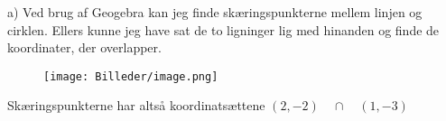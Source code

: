 a)
Ved brug af Geogebra kan jeg finde skæringspunkterne mellem linjen og cirklen. Ellers kunne jeg have sat de to ligninger lig med hinanden og finde de koordinater, der overlapper.
\begin{figure}[H]
    \centering
    \texttt{[image: Billeder/image.png]}
\end{figure}

Skæringspunkterne har altså koordinatsættene $(2,-2) \quad \cap \quad (1, -3)$ \newline


